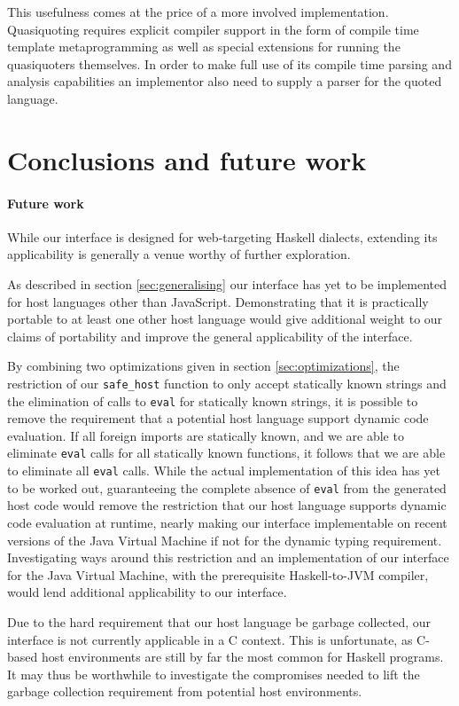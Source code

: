 \documentclass{sigplanconf}
\begin{document}
This usefulness comes at the price of a more involved implementation.
Quasiquoting requires explicit compiler support in the form of
compile time template metaprogramming as well as special extensions for running
the quasiquoters themselves.
In order to make full use of its compile time parsing and analysis capabilities
an implementor also need to supply a parser for the quoted language.

\section{Conclusions and future work}
\label{sec:conclusion}
\paragraph{Future work}
While our interface is designed for web-targeting Haskell dialects, extending
its applicability is generally a venue worthy of further exploration.

As described in section \ref{sec:generalising} our interface has yet to be
implemented for host languages other than JavaScript. Demonstrating that
it is practically portable to at least one other host language would give
additional weight to our claims of portability and improve the general
applicability of the interface.

By combining two optimizations given in section \ref{sec:optimizations},
the restriction of our \lstinline!safe_host! function to only accept statically
known strings and the elimination of calls to \lstinline!eval! for statically
known strings, it is possible to remove the requirement that a potential
host language support dynamic code evaluation.
If all foreign imports are statically known,
and we are able to eliminate \lstinline!eval! calls for all statically known
functions, it follows that we are able to eliminate all \lstinline!eval! calls.
While the actual implementation of this idea has yet to be worked out,
guaranteeing the complete absence of \lstinline!eval! from the generated host
code would remove the restriction that our host language supports dynamic code
evaluation at runtime, nearly making our interface implementable on
recent versions of the Java Virtual Machine if not for the dynamic typing
requirement. Investigating ways around this restriction and an implementation
of our interface for the Java Virtual Machine, with the
prerequisite Haskell-to-JVM compiler, would lend additional applicability to
our interface.

Due to the hard requirement that our host language be garbage collected,
our interface is not currently applicable in a C context. This is unfortunate,
as C-based host environments are still by far the most common for Haskell
programs. It may thus be worthwhile to investigate the compromises needed
to lift the garbage collection requirement from potential host environments.
\end{document}
